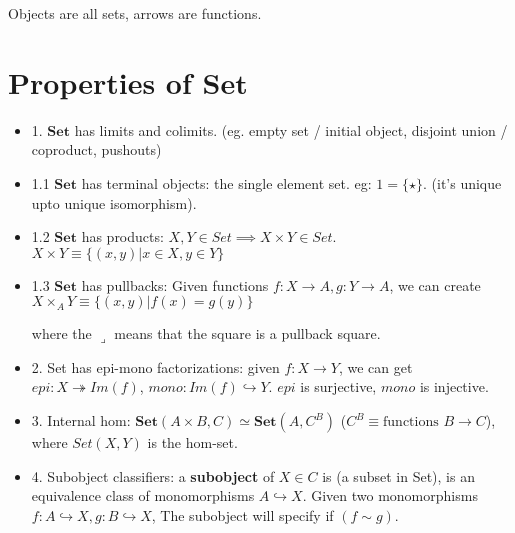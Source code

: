 \documentclass[11pt]{book}
\newcommand{\inj}{\hookrightarrow}
\newcommand{\sur}{\twoheadrightarrow}
\newcommand{\Set}{\ensuremath{\mathbf{Set}} }
\begin{document}
Objects are all sets, arrows are functions.

\section{Properties of \Set}
\begin{itemize}
    \item 1. \Set has limits and colimits. (eg. empty set / initial object, disjoint union / coproduct, pushouts)
    \item 1.1 \Set has terminal objects: the single element set. eg: $1 = \{ \star \}$. (it's unique upto unique isomorphism).
    \item 1.2 \Set has products: $X, Y \in Set \implies X \times Y \in Set$. $X \times Y \equiv \{ (x, y) | x \in X, y \in Y \}$
    \item 1.3 \Set has pullbacks: Given functions $f : X \to A, g: Y \to A$, we can create 
                $X \times_A Y \equiv \{ (x, y) | f(x) = g(y) \}$

        where the $\lrcorner$ means that the square is a pullback square.

    \item 2. Set has epi-mono factorizations: given $f: X \to Y$, we can get
        $epi: X \sur Im(f)$, $mono: Im(f) \inj Y$. $epi$ is surjective, $mono$ is injective.

    \item 3. Internal hom: $\Set(A \times B, C) \simeq \Set(A, C^B)$ ($C^B \equiv \text{functions $B \to C$}$),
        where $Set(X, Y)$ is the hom-set.
    \item 4. Subobject classifiers: a \textbf{subobject} of $X \in C$ is (a subset in Set), 
        is an equivalence class of monomorphisms $A \hookrightarrow X$. 
        Given two monomorphisms $f: A \inj X, g: B \inj X$, The subobject will specify if $(f \sim g)$.



\end{itemize}
\end{document}

